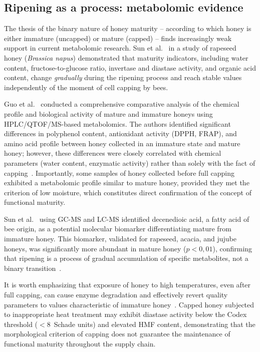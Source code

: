 \subsection{Ripening as a process: metabolomic evidence}

The thesis of the binary nature of honey maturity -- according to
which honey is either immature (uncapped) or mature (capped) --
finds increasingly weak support in current metabolomic research.
Sun et al.~\cite{sun2021} in a study of rapeseed honey
(\textit{Brassica napus}) demonstrated that maturity indicators,
including water content, fructose-to-glucose ratio, invertase and
diastase activity, and organic acid content, change \emph{gradually}
during the ripening process and reach stable values independently
of the moment of cell capping by bees.

Guo et al.~\cite{guo2020} conducted a comprehensive comparative
analysis of the chemical profile and biological activity of mature
and immature honeys using HPLC/QTOF/MS-based metabolomics. The
authors identified significant differences in polyphenol content,
antioxidant activity (DPPH, FRAP), and amino acid profile between
honey collected in an immature state and mature honey; however,
these differences were closely correlated with chemical parameters
(water content, enzymatic activity) rather than solely with
the fact of capping~\cite{guo2020}. Importantly, some samples of
honey collected before full capping exhibited a metabolomic profile
similar to mature honey, provided they met the criterion of low
moisture, which constitutes direct confirmation of the concept
of functional maturity.

Sun et al.~\cite{sun2021} using GC-MS and LC-MS identified
decenedioic acid, a fatty acid of bee origin, as a potential
molecular biomarker differentiating mature from immature honey.
This biomarker, validated for rapeseed, acacia, and jujube honeys,
was significantly more abundant in mature honey ($p < 0{,}01$),
confirming that ripening is a process of gradual accumulation of
specific metabolites, not a binary transition~\cite{sun2021}.

It is worth emphasizing that exposure of honey to high temperatures,
even after full capping, can cause enzyme degradation and effectively
revert quality parameters to values characteristic of immature
honey~\cite{biochemreactions2022}.
Capped honey subjected to inappropriate heat treatment may exhibit
diastase activity below the Codex threshold ($< 8$~Schade units)
and elevated HMF content, demonstrating that the morphological
criterion of capping does not guarantee the maintenance of
functional maturity throughout the supply chain.

